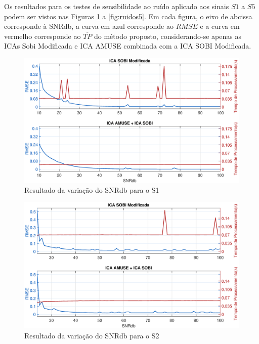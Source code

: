 \documentclass[a4paper,12pt]{monografia}
\theoremstyle{plain}
\theoremstyle{definition}
\theoremstyle{remark}
\begin{document}
Os resultados para os testes de sensibilidade ao ruído aplicado aos sinais $S1$ a $S5$ podem ser vistos nas Figuras \ref{fig:ruidos1} a \ref{fig:ruidos5}. Em cada figura, o eixo de abcissa corresponde à SNRdb, a curva em azul corresponde ao $\overline{RMSE}$ e a curva em vermelho corresponde ao $\overline{TP}$ do método proposto, considerando-se apenas as ICAs Sobi Modificada e ICA AMUSE combinada com a ICA SOBI Modificada.

\begin{figure}[!htb]
    \begin{center}
    \advance\leftskip -1.5cm
    \includegraphics[scale=0.45]{imagens/Sinal1Ruidov2.eps}
    \caption{Resultado da variação do SNRdb para o S1}
    \label{fig:ruidos1}    
    \end{center}
\end{figure}

\begin{figure}[!htb]
    \begin{center}
    \advance\leftskip -1.5cm
    \includegraphics[scale=0.45]{imagens/Sinal2Ruidov2.eps}
    \caption{Resultado da variação do SNRdb para o S2}
    \label{fig:ruidos2}    
    \end{center}
\end{figure}
\end{document}
